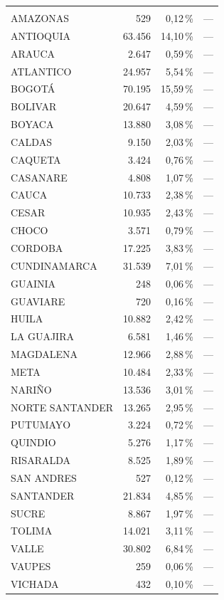 \begin{longtable}{P{6.2cm} r r r}
  \addlinespace
   \\
  AMAZONAS & 529 & 0,12\,\% & --- \\
  ANTIOQUIA & 63.456 & 14,10\,\% & --- \\
  ARAUCA & 2.647 & 0,59\,\% & --- \\
  ATLANTICO & 24.957 & 5,54\,\% & --- \\
  BOGOTÁ & 70.195 & 15,59\,\% & --- \\
  BOLIVAR & 20.647 & 4,59\,\% & --- \\
  BOYACA & 13.880 & 3,08\,\% & --- \\
  CALDAS & 9.150 & 2,03\,\% & --- \\
  CAQUETA & 3.424 & 0,76\,\% & --- \\
  CASANARE & 4.808 & 1,07\,\% & --- \\
  CAUCA & 10.733 & 2,38\,\% & --- \\
  CESAR & 10.935 & 2,43\,\% & --- \\
  CHOCO & 3.571 & 0,79\,\% & --- \\
  CORDOBA & 17.225 & 3,83\,\% & --- \\
  CUNDINAMARCA & 31.539 & 7,01\,\% & --- \\
  GUAINIA & 248 & 0,06\,\% & --- \\
  GUAVIARE & 720 & 0,16\,\% & --- \\
  HUILA & 10.882 & 2,42\,\% & --- \\
  LA GUAJIRA & 6.581 & 1,46\,\% & --- \\
  MAGDALENA & 12.966 & 2,88\,\% & --- \\
  META & 10.484 & 2,33\,\% & --- \\
  NARIÑO & 13.536 & 3,01\,\% & --- \\
  NORTE SANTANDER & 13.265 & 2,95\,\% & --- \\
  PUTUMAYO & 3.224 & 0,72\,\% & --- \\
  QUINDIO & 5.276 & 1,17\,\% & --- \\
  RISARALDA & 8.525 & 1,89\,\% & --- \\
  SAN ANDRES & 527 & 0,12\,\% & --- \\
  SANTANDER & 21.834 & 4,85\,\% & --- \\
  SUCRE & 8.867 & 1,97\,\% & --- \\
  TOLIMA & 14.021 & 3,11\,\% & --- \\
  VALLE & 30.802 & 6,84\,\% & --- \\
  VAUPES & 259 & 0,06\,\% & --- \\
  VICHADA & 432 & 0,10\,\% & --- \\
\end{longtable}
\endgroup
\vspace{-0.8em}
